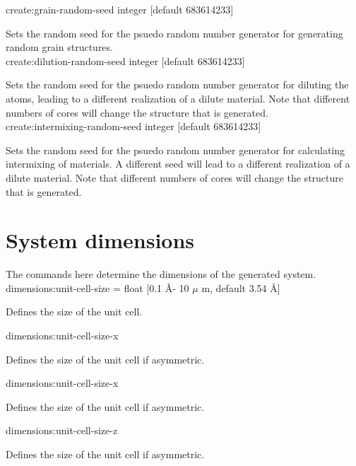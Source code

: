 {\zicf create:grain-random-seed integer [default 683614233]}
Sets the random seed for the psuedo random number generator for generating random
grain structures. \\

{\zicf create:dilution-random-seed integer [default 683614233]}
Sets the random seed for the psuedo random number generator for diluting the
atoms, leading to a different realization of a dilute material. Note that
different numbers of cores will change the structure that is generated.\\

{\zicf create:intermixing-random-seed integer [default 683614233]}
Sets the random seed for the psuedo random number generator for calculating
intermixing of materials. A different seed will lead to a different realization
of a dilute material. Note that different numbers of cores will change the
structure that is generated.\\

\section*{System dimensions}
The commands here determine the dimensions of the generated system.\\

{\zicf dimensions:unit-cell-size = float [0.1 \AA - 10 $\mu$ m, default 3.54 \AA]} Defines the size of the unit cell.\\ \par

{\zicf dimensions:unit-cell-size-x} Defines the size of the unit cell if asymmetric.\\ \par

{\zicf dimensions:unit-cell-size-x} Defines the size of the unit cell if asymmetric.\\ \par

{\zicf dimensions:unit-cell-size-z} Defines the size of the unit cell if asymmetric.\\ \par

